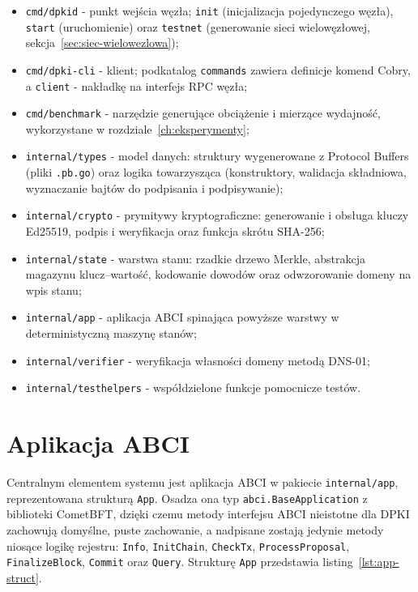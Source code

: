 \begin{itemize}
    \item \texttt{cmd/dpkid} - punkt wejścia węzła; \texttt{init} (inicjalizacja pojedynczego węzła), \texttt{start} (uruchomienie) oraz \texttt{testnet} (generowanie sieci wielowęzłowej, sekcja~\ref{sec:siec-wielowezlowa});
    \item \texttt{cmd/dpki-cli} - klient; podkatalog \texttt{commands} zawiera definicje komend Cobry, a \texttt{client} - nakładkę na interfejs RPC węzła;
    \item \texttt{cmd/benchmark} - narzędzie generujące obciążenie i mierzące wydajność, wykorzystane w rozdziale~\ref{ch:eksperymenty};
    \item \texttt{internal/types} - model danych: struktury wygenerowane z Protocol Buffers (pliki \texttt{.pb.go}) oraz logika towarzysząca (konstruktory, walidacja składniowa, wyznaczanie bajtów do podpisania i podpisywanie);
    \item \texttt{internal/crypto} - prymitywy kryptograficzne: generowanie i obsługa kluczy Ed25519, podpis i weryfikacja oraz funkcja skrótu SHA-256;
    \item \texttt{internal/state} - warstwa stanu: rzadkie drzewo Merkle, abstrakcja magazynu klucz--wartość, kodowanie dowodów oraz odwzorowanie domeny na wpis stanu;
    \item \texttt{internal/app} - aplikacja ABCI spinająca powyższe warstwy w deterministyczną maszynę stanów;
    \item \texttt{internal/verifier} - weryfikacja własności domeny metodą DNS-01;
    \item \texttt{internal/testhelpers} - współdzielone funkcje pomocnicze testów.
\end{itemize}

\section{Aplikacja ABCI}
\label{sec:aplikacja-abci}

Centralnym elementem systemu jest aplikacja ABCI w pakiecie \texttt{internal/\allowbreak app}, reprezentowana strukturą \texttt{App}. Osadza ona typ \texttt{abci.BaseApplication} z biblioteki CometBFT, dzięki czemu metody interfejsu ABCI nieistotne dla DPKI zachowują domyślne, puste zachowanie, a nadpisane zostają jedynie metody niosące logikę rejestru: \texttt{Info}, \texttt{InitChain}, \texttt{CheckTx}, \texttt{ProcessProposal}, \texttt{FinalizeBlock}, \texttt{Commit} oraz \texttt{Query}. Strukturę \texttt{App} przedstawia listing~\ref{lst:app-struct}.

